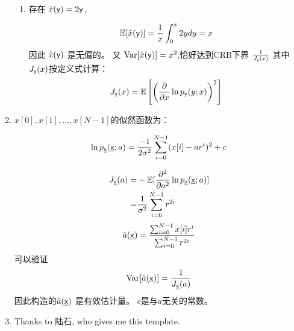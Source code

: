 \documentclass[a4paper]{article}
\begin{document}
\begin{enumerate}[label=\thehwcnt.\arabic*.]
\begin{enumerate}[label=(\alph*)]
  \item
    存在 $ \hat{x}(\mathsf{y})=2\mathsf{y}$, 
    
    \[
    \operatorname{\mathbb{E}}[\hat{x}(\mathsf{y})] = \frac{1}{x}\int_0^{x} 2 y d y = x
    \]
    因此 $\hat{x}(\mathsf{y})$ 是无偏的。
    又 $\operatorname{Var}[\hat{x}(\mathsf{y})]=x^2$,恰好达到CRB下界 $\frac{1}{J_{\mathsf{y}}(x)}$
    其中$J_{\mathsf{y}}(x)$按定义式计算：
    \[
      J_{\mathsf{y}}(x) = \operatorname{\mathbb{E}}\left[\left(\frac{\partial}{\partial x} \ln p_{\mathsf{y}}(y;x) \right)^2\right]
    \]
    
    \end{enumerate}
  \item $x[0],x[1],\dots,x[N-1]$的似然函数为：
  
      \[
      \ln p_{\underline{\mathsf{x}}}(\underline{\mathsf{x}};a)=\frac{-1}{2\sigma^2}\sum_{i=0}^{N-1} (x[i]-ar^i)^2+c
      \]
  
      \begin{align*}
      J_{\underline{\mathsf{x}}}(a)=&-\operatorname{\mathbb{E}}[\frac{\partial^2}{\partial a^2}\ln p_{\underline{\mathsf{x}}}(\underline{\mathsf{x}};a)]\\
      = & \frac{1}{\sigma^2}\sum_{i=0}^{N-1} r^{2i}
      \end{align*}
  \[
  \hat{a}(\underline{\mathsf{x}})=\frac{\sum_{i=0}^{N-1} x[i] r^i}{\sum_{i=0}^{N-1} r^{2i}}
  \]
  可以验证
  \[
  \operatorname{Var}[\hat{a}(\underline{\mathsf{x}})]=\frac{1}{J_{\underline{\mathsf{x}}}(a)}
  \]
  因此构造的$\hat{a}(\underline{\mathsf{x}})$ 是有效估计量。
  $c$是与$a$无关的常数。
  \item Thanks to 陆石, who gives me this template.
  

  \end{enumerate}
\end{document}
